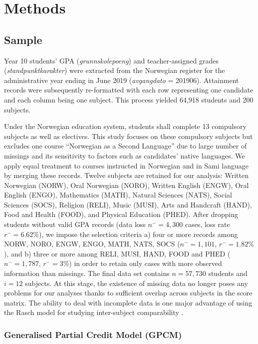 \section{Methods}

\subsection{Sample}

Year 10 students' GPA (\textit{grunnskolepoeng}) and teacher-assigned grades (\textit{standpunktkarakter}) were extracted from the Norwegian register for the administrative year ending in June 2019 (\textit{avgangdato} = 201906). Attainment records were subsequently re-formatted with each row representing one candidate and each column being one subject. This process yielded 64,918 students and 200 subjects.

Under the Norwegian education system, students shall complete 13 compulsory subjects as well as electives. This study focuses on these compulsory subjects but excludes one course ``Norwegian as a Second Language'' due to large number of missings and its sensitivity to factors such as candidates' native languages. We apply equal treatment to courses instructed in Norwegian and in Sami language by merging these records. Twelve subjects are retained for our analysis: Written Norwegian (NORW), Oral Norwegian (NORO), Written English (ENGW), Oral English (ENGO), Mathematics (MATH), Natural Sciences (NATS), Social Sciences (SOCS), Religion (RELI), Music (MUSI), Arts and Handcraft (HAND), Food and Health (FOOD), and Physical Education (PHED). After dropping students without valid GPA records (data loss $n^-= 4,300$ cases, loss rate $r^- = 6.62\%$), we impose the selection criteria a) four or more records among NORW, NORO, ENGW, ENGO, MATH, NATS, SOCS ($n^- = 1,101$, $r^- = 1.82\%$), and b) three or more among RELI, MUSI, HAND, FOOD and PHED ($n^-= 1,787$, $r^- = 3\%$) in order to retain only cases with more observed information than missings. The final data set contains $n = 57,730$ students and $i = 12$ subjects. At this stage, the existence of missing data no longer poses any problems for our analyses thanks to sufficient overlap across subjects in the score matrix. The ability to deal with incomplete data is one major advantage of using the Rasch model for studying inter-subject comparability \parencite{he:2018}.



\subsubsection{Generalised Partial Credit Model (GPCM)}

